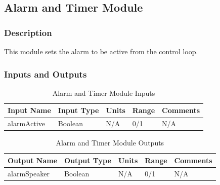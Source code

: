 \documentclass[12pt,titlepage]{article}
\begin{document}


\subsection{Alarm and Timer Module }
\subsubsection*{Description}
This module sets the alarm to be active from the control loop.
\subsubsection*{Inputs and Outputs}

\begin{table}[ht!]
\begin{center}
\begin{adjustbox}{max width=\textwidth}
\small
\begin{tabular}{|p{}|p{}|p{}|p{}|p{}|}
 \hline
 \textbf{Input Name} & \textbf{Input Type} & \textbf{Units} &\textbf{Range} & \textbf{Comments} \\
 \hline 
 alarmActive & Boolean  & N/A & 0/1 & N/A \\
 \hline
\end{tabular}
\end{adjustbox}
\end{center}
\caption{Alarm and Timer Module Inputs}
\end{table}

\begin{table}[ht!]
\begin{center}
\begin{adjustbox}{max width=\textwidth}
\small
\begin{tabular}{|p{}|p{}|p{}|p{}|p{}|}
 \hline
 \textbf{Output Name} & \textbf{Output Type} & \textbf{Units} &\textbf{Range} & \textbf{Comments} \\
 \hline 
 alarmSpeaker & Boolean & N/A & 0/1 & N/A \\
 \hline
\end{tabular}
\end{adjustbox}
\end{center}
\caption{Alarm and Timer Module Outputs}
\end{table}
\end{document}
